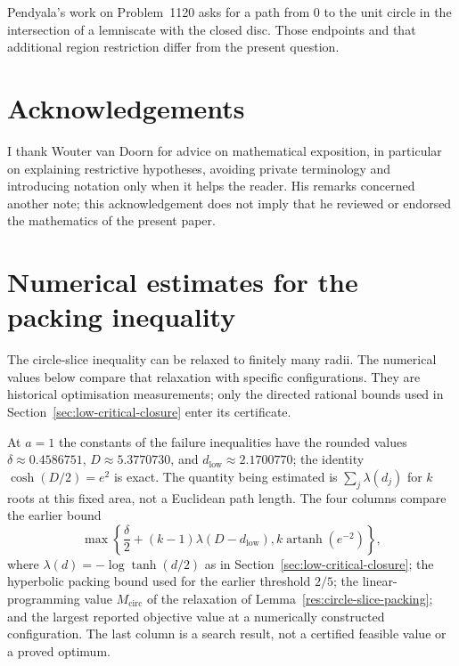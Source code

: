 \documentclass[11pt]{article}
\begin{document}
Pendyala's work
on Problem~1120 \cite[Definition~1.1 and Theorem~1.2]{pendyala2026shortest}
asks for a path from $0$ to the unit circle in the intersection of a
lemniscate with the closed disc. Those endpoints and that additional
region restriction differ from the present question.

\section*{Acknowledgements}
I thank Wouter van Doorn for advice on mathematical exposition, in particular
on explaining restrictive hypotheses, avoiding private terminology and
introducing notation only when it helps the reader. His remarks concerned
another note; this acknowledgement does not imply that he reviewed or
endorsed the mathematics of the present paper.

\appendix

\section{Numerical estimates for the packing inequality}
\label{sec:record-circle-slice}

The circle-slice inequality can be relaxed to finitely many radii.
The numerical values below compare that relaxation with specific
configurations. They are historical optimisation measurements; only
the directed rational bounds used in
Section~\ref{sec:low-critical-closure} enter its certificate.

At $a=1$ the constants of the failure inequalities have the rounded
values $\delta\approx0.4586751$, $D\approx5.3770730$, and
$d_{\mathrm{low}}\approx2.1700770$; the identity $\cosh(D/2)=e^{2}$ is exact. The quantity being estimated is
$\sum_j\lambda(d_j)$ for $k$ roots at this fixed area, not a Euclidean
path length. The four columns compare the earlier bound
\[
 \max\!\left\{\frac\delta2+(k-1)\lambda(D-d_{\mathrm{low}}),
                  k\operatorname{artanh}(e^{-2})\right\},
\]
where $\lambda(d)=-\log\tanh(d/2)$ as in
Section~\ref{sec:low-critical-closure}; the hyperbolic packing bound used
for the earlier threshold $2/5$; the linear-programming value
$M_{\mathrm{circ}}$ of the relaxation of
Lemma~\ref{res:circle-slice-packing}; and the largest reported objective
value at a numerically constructed configuration. The last column is a
search result, not a certified feasible value or a proved optimum.
\end{document}
